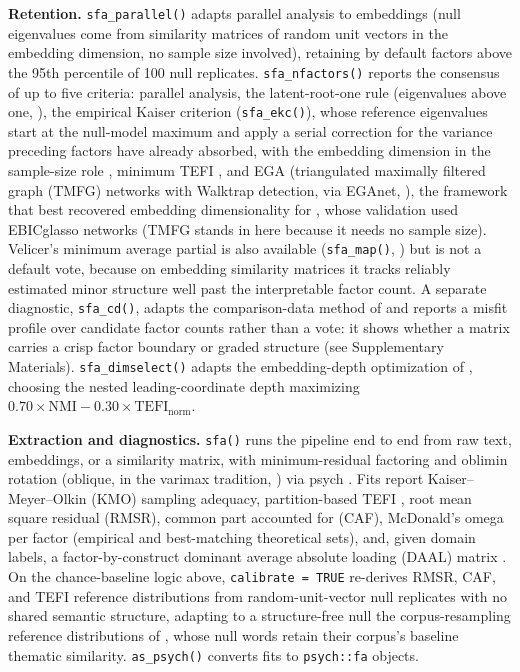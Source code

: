 \textbf{Retention.} \texttt{sfa\_parallel()} adapts parallel analysis \citep{horn-1965} to embeddings (null eigenvalues come from similarity matrices of random unit vectors in the embedding dimension, no sample size involved), retaining by default factors above the 95th percentile of 100 null replicates. \texttt{sfa\_nfactors()} reports the consensus of up to five criteria: parallel analysis, the latent-root-one rule (eigenvalues above one, \citealp{kaiser-1960}), the empirical Kaiser criterion (\texttt{sfa\_ekc()}), whose reference eigenvalues start at the null-model maximum and apply a serial correction for the variance preceding factors have already absorbed, with the embedding dimension in the sample-size role \citep{braeken-vanassen-2017}, minimum TEFI \citep{golino-etal-2021}, and EGA (triangulated maximally filtered graph (TMFG) networks with Walktrap detection, via EGAnet, \citealp{golino-christensen-2026}), the framework that best recovered embedding dimensionality for \citet{garrido-etal-2025}, whose validation used EBICglasso networks (TMFG stands in here because it needs no sample size). Velicer's minimum average partial is also available (\texttt{sfa\_map()}, \citealp{velicer-1976}) but is not a default vote, because on embedding similarity matrices it tracks reliably estimated minor structure well past the interpretable factor count. A separate diagnostic, \texttt{sfa\_cd()}, adapts the comparison-data method of \citet{ruscio-roche-2012} and reports a misfit profile over candidate factor counts rather than a vote: it shows whether a matrix carries a crisp factor boundary or graded structure (see Supplementary Materials). \texttt{sfa\_dimselect()} adapts the embedding-depth optimization of \citet{golino-2026}, choosing the nested leading-coordinate depth maximizing $0.70 \times \mathrm{NMI} - 0.30 \times \mathrm{TEFI}_{\mathrm{norm}}$.

\textbf{Extraction and diagnostics.} \texttt{sfa()} runs the pipeline end to end from raw text, embeddings, or a similarity matrix, with minimum-residual factoring and oblimin rotation (oblique, in the varimax tradition, \citealp{kaiser-1958}) via psych \citep{revelle-2026}. Fits report Kaiser--Meyer--Olkin (KMO) sampling adequacy, partition-based TEFI \citep{golino-etal-2021}, root mean square residual (RMSR), common part accounted for (CAF), McDonald's omega per factor (empirical and best-matching theoretical sets), and, given domain labels, a factor-by-construct dominant average absolute loading (DAAL) matrix \citep{guenole-etal-2025}. On the chance-baseline logic above, \texttt{calibrate = TRUE} re-derives RMSR, CAF, and TEFI reference distributions from random-unit-vector null replicates with no shared semantic structure, adapting to a structure-free null the corpus-resampling reference distributions of \citet{pokropek-2026}, whose null words retain their corpus's baseline thematic similarity. \texttt{as\_psych()} converts fits to \texttt{psych::fa} objects.

